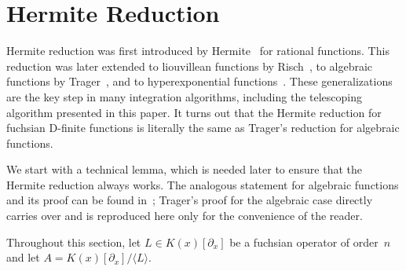 \documentclass[final,1p,times,authoryear]{elsarticle}
\def\<#1>{\langle#1\rangle}
\begin{document}
\section{Hermite Reduction}\label{sec:hermite}

Hermite reduction was first introduced by Hermite~\citep{Hermite1872} for
rational functions.  This reduction was later extended to liouvillean
functions by Risch~\citep{Risch1969,Risch1970,ACA1992,bronstein98,BronsteinBook}, to algebraic functions by
Trager~\citep{trager84,ACA1992,bronstein98}, and to hyperexponential
functions~\citep{bostan13a}.  These generalizations are the key step in many
integration algorithms, including the telescoping algorithm presented in this
paper. It turns out that the Hermite reduction for fuchsian D-finite functions
is literally the same as Trager's reduction for algebraic functions.

We start with a technical lemma, which is needed later to ensure that the
Hermite reduction always works. The analogous statement for algebraic
functions and its proof can be found in~\citep[pp. 46--47]{trager84}; Trager's
proof for the algebraic case directly carries over and is reproduced here
only for the convenience of the reader.

Throughout this section, let $L\in K(x)[\partial_x]$ be a fuchsian operator
of order~$n$ and let $A=K(x)[\partial_x]/\<L>$.
\end{document}
